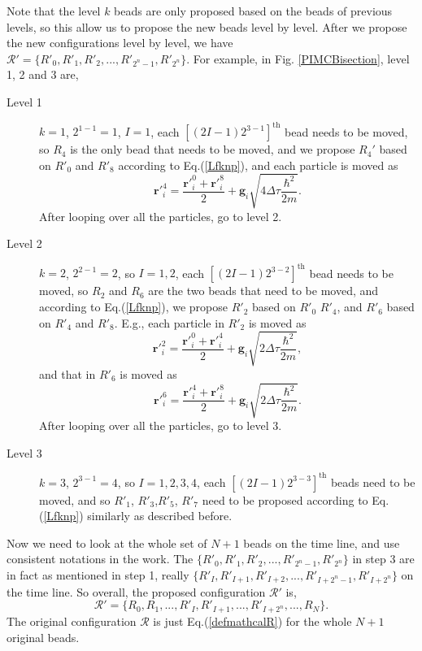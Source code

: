 \documentclass[12pt,letterpaper,UTF8]{report}
\begin{document}
\begin{description}
Note that the level $k$ beads are only proposed based on the beads of previous levels, so this allow us to propose the new beads level by level.
After we propose the new configurations level by level, we have $\mathcal{R}'=\{R'_0, R'_1, R'_2, ..., R'_{2^n-1}, R'_{2^n} \}$.
For example, in Fig. \ref{PIMCBisection}, level 1, 2 and 3 are,
\begin{description}
    \item[Level 1] $k=1$, $2^{1-1}=1$, $I=1$, each $[{(2I-1){2^{3-1}}}]^{\text{th}}$ bead needs to be moved, so $R_4$ is the only bead that needs to be moved, and we propose $R_4'$ based on $R'_0$ and $R'_8$ according to Eq.(\ref{Lfknp}), and each particle is moved as
          \begin{equation}
  {\bm{r}'}_i^{4} =
  \frac{ {\bm{r}'}_i^{0}  + {\bm{r}'}_i^{8}      }{2}
  + \bm{g}_i \sqrt{ 4 \Delta \tau \frac{\hbar^2}{2m}} .
\end{equation}
       After looping over all the particles, go to level 2.
    \item[Level 2] $k=2$, $2^{2-1}=2$, so $I=1,2$, each $[(2I-1){2^{3-2}}]^{\text{th}}$ bead needs to be moved, so $R_2$ and $R_6$ are the two beads that need to be moved, and according to Eq.(\ref{Lfknp}), we propose $R'_2$ based on $R'_0$ $R'_4$, and $R'_6$ based on $R'_4$ and $R'_8$. E.g., each particle in $R'_2$ is moved as
          \begin{equation}
  {\bm{r}'}_i^{2} =
  \frac{ {\bm{r}'}_i^{0}  + {\bm{r}'}_i^{4}      }{2}
  + \bm{g}_i \sqrt{ 2 \Delta \tau \frac{\hbar^2}{2m}} ,
\end{equation}
and that in  $R'_6$ is moved as
          \begin{equation}
  {\bm{r}'}_i^{6} =
  \frac{ {\bm{r}'}_i^{4}  + {\bm{r}'}_i^{8}      }{2}
  + \bm{g}_i \sqrt{ 2 \Delta \tau \frac{\hbar^2}{2m}}.
\end{equation}
 After looping over all the particles, go to level 3.
    \item[Level 3] $k=3$, $2^{3-1}=4$, so $I=1,2,3,4$, each $[(2I-1){2^{3-3}}]^{\text{th}}$ beads need to be moved, and so $R'_1$, $R'_3$,$R'_5$, $R'_7$ need to be proposed according to Eq.(\ref{Lfknp}) similarly as described before.
  \end{description}

  \item[Step 4] Now we need to look at the whole set of $N+1$ beads on the time line, and use consistent notations in the work. The $\{R'_0, R'_1, R'_2, ..., R'_{2^n-1}, R'_{2^n} \}$ in step 3 are in fact as mentioned in step 1, really $\{R'_I, R'_{I+1}, R'_{I+2}, ..., R'_{I+2^n-1}, R'_{I+2^n} \}$ on the time line. So overall, the proposed configuration $\mathcal{R}'$ is,
  \begin{equation}
\mathcal{R}'=\{R_0,R_1,...,R'_I, R'_{I+1}, ..., R'_{I+2^n}, ..., R_N \}.
\end{equation}
    The original configuration $\mathcal{R}$ is just Eq.(\ref{defmathcalR}) for the whole $N+1$ original beads.


\end{description}
\end{document}
